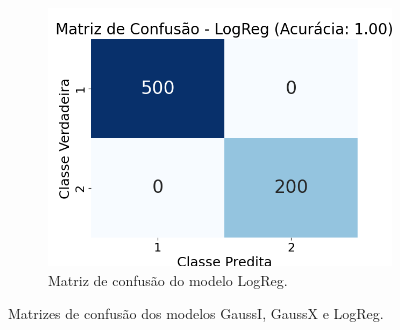 \begin{enumerate}
\begin{figure}[H]
        \hfill
        \begin{subfigure}[b]{0.3\textwidth}
            \centering
            \includegraphics[width=\textwidth]{fig/LogReg.png}
            \caption{Matriz de confusão do modelo LogReg.}
            \label{fig:confusion_matrix_logreg}
        \end{subfigure}
        \caption{Matrizes de confusão dos modelos GaussI, GaussX e LogReg.}
        \label{fig:confusion_matrices}
    \end{figure}

\end{enumerate}
